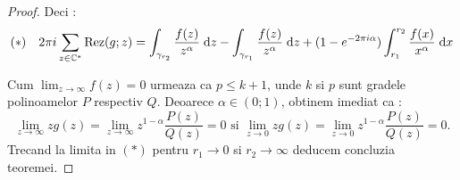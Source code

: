\begin{theorem}
\begin{proof}
            Deci :
            \[
               (*) \quad 2 \pi i  \sum_{z\in \mathbb{C}^*} \operatorname{Rez}(g;z)
                    = \int_{\gamma_{r_2}} \frac{f(z)}{z^\alpha} \; \mathrm{d} z
                    - \int_{\gamma_{r_1}} \frac{f(z)}{z^\alpha} \; \mathrm{d} z
                    + (1-e^{-2\pi i \alpha}) \int_{r_1}^{r_2} \frac{f(x)}{x^\alpha} \; \mathrm{d} x
            \]

            Cum $\displaystyle \lim_{z\to\infty} f(z) = 0$ urmeaza ca $p \leq k+1$, unde $k$ si $p$
            sunt gradele polinoamelor $P$ respectiv $Q$. Deoarece $\alpha \in (0;1)$, obtinem imediat
            ca :
            \[
                \lim_{z\to\infty} z g(z) = \lim_{z\to\infty} z^{1-\alpha} \frac{P(z)}{Q(z)} = 0
                \text{ si }
                \lim_{z\to 0} z g(z) = \lim_{z\to 0} z^{1-\alpha} \frac{P(z)}{Q(z)} = 0 .
            \]
            Trecand la limita in $(*)$ pentru $r_1 \to 0$ si $r_2 \to \infty$ deducem concluzia teoremei.
        \end{proof}
    \end{theorem}

